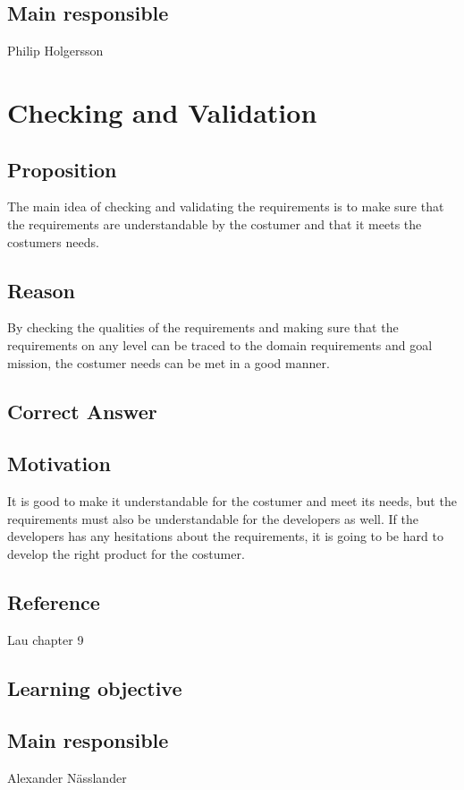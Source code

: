 \documentclass[a4paper]{article}
\begin{document}
\subsection*{Main responsible}
Philip Holgersson



\section{Checking and Validation}

\subsection*{Proposition}
The main idea of checking and validating the requirements is to make sure that the requirements are understandable by the costumer and that it meets the costumers needs.
\subsection*{Reason}
By checking the qualities of the requirements and making sure that the requirements on any level can be traced to the domain requirements and goal mission, the costumer needs can be met in a good manner.
\subsection*{Correct Answer}

\subsection*{Motivation}
 It is good to make it understandable for the costumer and meet its needs, but the requirements must also be understandable for the developers as well. If the developers has any hesitations about the requirements, it is going to be hard to develop the right product for the costumer.
\subsection*{Reference}
Lau chapter 9
\subsection*{Learning objective}

\subsection*{Main responsible}
Alexander Nässlander
\end{document}
